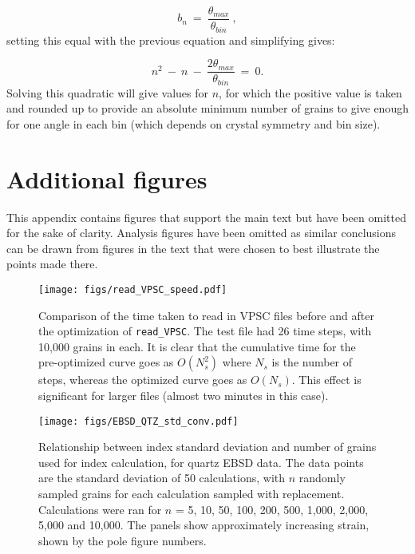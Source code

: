 \documentclass[a4paper,12pt,twoside]{report}
\numberwithin{equation}{chapter}
\begin{document}
\begin{equation} \label{App:eq:nbins}
b_n\ =\ \frac{\theta_{max}}{\theta_{bin}}\ ,
\end{equation}
\noindent
setting this equal with the previous equation and simplifying gives:

\begin{equation}
n^2\ -\ n\ -\ \frac{2\theta_{max}}{\theta_{bin}}\ =\ 0.
\end{equation}
\noindent
Solving this quadratic will give values for $n$, for which the positive value is taken and rounded up to provide an absolute minimum number of grains to give enough for one angle in each bin (which depends on crystal symmetry and bin size).

\newpage
\section{Additional figures} \label{App:analysis_figs}
This appendix contains figures that support the main text but have been omitted for the sake of clarity. Analysis figures have been omitted as similar conclusions can be drawn from figures in the text that were chosen to best illustrate the points made there. 
\\

\begin{figure}[h!]
  \centering
    \texttt{[image: figs/read\_VPSC\_speed.pdf]}
  \caption[Read VPSC optimization]{Comparison of the time taken to read in VPSC files before and after the optimization of \texttt{read\_{}VPSC}. The test file had 26 time steps, with 10,000 grains in each. It is clear that the cumulative time for the pre-optimized curve goes as $O(N_s^2)$ where $N_s$ is the number of steps, whereas the optimized curve goes as $O(N_s)$. This effect is significant for larger files (almost two minutes in this case).}
  \label{fig:app:read_VPSC}
\end{figure} 

\begin{figure}[h!]
  \centering
    \texttt{[image: figs/EBSD\_QTZ\_std\_conv.pdf]}
  \caption[Index error with no. grains (quartz EBSD)]{Relationship between index standard deviation and number of grains used for index calculation, for quartz EBSD data. The data points are the standard deviation of 50 calculations, with $n$ randomly sampled grains for each calculation sampled with replacement. Calculations were ran for $n$ = 5, 10, 50, 100, 200, 500, 1,000, 2,000, 5,000 and 10,000. The panels show approximately increasing strain, shown by the pole figure numbers.}
  \label{fig:app:QTZ_EBSD_n_conv_err}
\end{figure}
\end{document}
